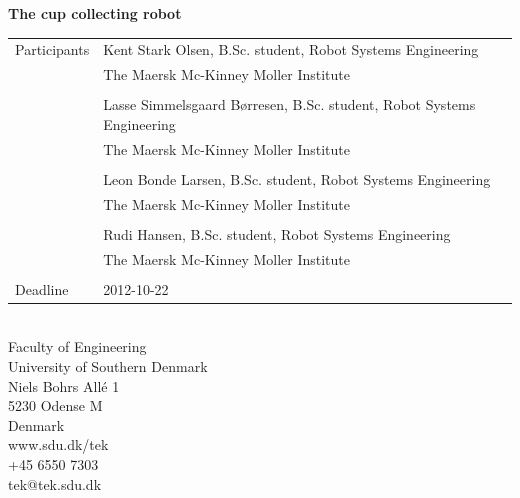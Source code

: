 \begin{titlepage}
\textsf{\Large{\textbf{\textcolor{FrontpageHeadingColor}{The cup collecting robot}}}}\\
\vspace{1.0cm}
\setlength{\extrarowheight}{1.5pt}
\begin{tabular}{@{}l l}
	\textsf{\large{Participants}} & \textsf{\large{Kent Stark Olsen, B.Sc. student, Robot Systems Engineering}}\\
	& \textsf{\large{The Maersk Mc-Kinney Moller Institute}}\\
	\\
	& \textsf{\large{Lasse Simmelsgaard Børresen, B.Sc. student, Robot Systems Engineering}}\\
	& \textsf{\large{The Maersk Mc-Kinney Moller Institute}}\\
	\\
	& \textsf{\large{Leon Bonde Larsen, B.Sc. student, Robot Systems Engineering}}\\
	& \textsf{\large{The Maersk Mc-Kinney Moller Institute}}\\
	\\
	& \textsf{\large{Rudi Hansen, B.Sc. student, Robot Systems Engineering}}\\
	& \textsf{\large{The Maersk Mc-Kinney Moller Institute}}\\
	\\
	\textsf{\large{Deadline}} & \textsf{\large{2012-10-22}}
\end{tabular}
\vfill
\textsf{\\Faculty of Engineering\\
University of Southern Denmark\\
Niels Bohrs Allé 1\\
5230 Odense M\\
Denmark}
\vspace*{10pt}
\\
\textsf{www.sdu.dk/tek\\
+45 6550 7303\\
tek@tek.sdu.dk}
\end{titlepage}
